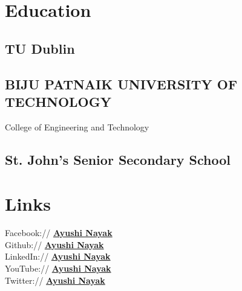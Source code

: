 \documentclass[]{deedy-resume-openfont}
\begin{document}
%
%
\lastupdated

%
%

%
%

\begin{minipage}[t]{0.33\textwidth} 


\section{Education} 

\subsection{TU Dublin}
\sectionsep

\subsection{BIJU PATNAIK UNIVERSITY OF TECHNOLOGY}
College of Engineering and Technology \\
\sectionsep

\subsection{St. John's Senior Secondary School}
\sectionsep


\section{Links} 
Facebook:// \href{https://www.facebook.com/ayushishradha}{\bf Ayushi Nayak} \\
Github:// \href{https://github.com/AyyNayak}{\bf Ayushi Nayak} \\
LinkedIn://  \href{https://www.linkedin.com/in/ayushinayak}{\bf Ayushi Nayak} \\
YouTube://  \href{https://www.youtube.com/channel/UCyy1Hf36JmKnh4T0i3I430w}{\bf Ayushi Nayak} \\
Twitter://  \href{https://twitter.com/Ayy_Nay}{\bf Ayushi Nayak} \\



\end{minipage}
\end{document}
